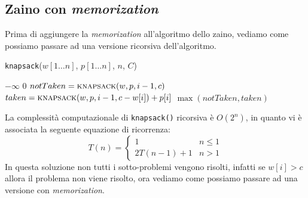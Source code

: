         \subsection{Zaino con \textit{memorization}}
            Prima di aggiungere la \textit{memorization} all'algoritmo dello zaino, vediamo come possiamo passare ad una versione ricorsiva dell'algoritmo.
            \begin{algorithm}
                \caption{\Int \texttt{knapsack}(\Int[] $w[1 \ldots n]$, \Int[] $p[1 \ldots n]$, \Int $n$, \Int $C$)}
                \begin{algorithmic}
                        \State \Return $-\infty$
                        \State \Return $0$
                    \Else
                        \State $notTaken = \Call{knapsack}{w, p, i-1, c}$
                        \State $taken = \Call{knapsack}{w, p, i-1, c-w[i]}+p[i]$
                        \State \Return $\max(notTaken, taken)$
                    \EndIf
                \end{algorithmic}
            \end{algorithm}
            La complessità computazionale di \texttt{knapsack()} ricorsiva è $O(2^n)$, in quanto vi è associata la seguente equazione di ricorrenza:
            $$
                T(n)=\begin{cases}
                    1 & n\leq 1\\
                    2T(n-1)+1 & n>1
                \end{cases}
            $$
            In questa soluzione non tutti i sotto-problemi vengono risolti, infatti se $w[i]>c$ allora il problema non viene risolto, ora vediamo come possiamo passare ad una versione con \textit{memorization}.
